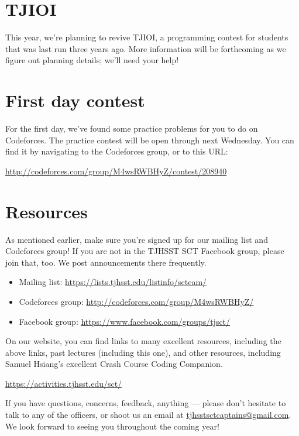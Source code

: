 \documentclass{article}
\begin{document}
\section{TJIOI}

This year, we're planning to revive TJIOI, a programming contest for students that was last run three years ago. More information will be forthcoming as we figure out planning details; we'll need your help!


\section{First day contest}

For the first day, we've found some practice problems for you to do on Codeforces. The practice contest will be open through next Wednesday. You can find it by navigating to the Codeforces group, or to this URL:

\begin{center}
\Large{\url{http://codeforces.com/group/M4wsRWBHyZ/contest/208940}}
\end{center}


\section{Resources}

As mentioned earlier, make sure you're signed up for our mailing list and Codeforces group! If you are not in the TJHSST SCT Facebook group, please join that, too. We post announcements there frequently.

\begin{itemize}
    \item Mailing list: \url{https://lists.tjhsst.edu/listinfo/scteam/}
    \item Codeforces group: \url{http://codeforces.com/group/M4wsRWBHyZ/}
    \item Facebook group: \url{https://www.facebook.com/groups/tjsct/}
\end{itemize}

On our website, you can find links to many excellent resources, including the above links, past lectures (including this one), and other resources, including Samuel Hsiang's excellent Crash Course Coding Companion.

\begin{center}
\Large{\url{https://activities.tjhsst.edu/sct/}}
\end{center}

If you have questions, concerns, feedback, anything — please don't hesitate to talk to any of the officers, or shoot us an email at \url{tjhsstsctcaptains@gmail.com}. We look forward to seeing you throughout the coming year!
\end{document}
